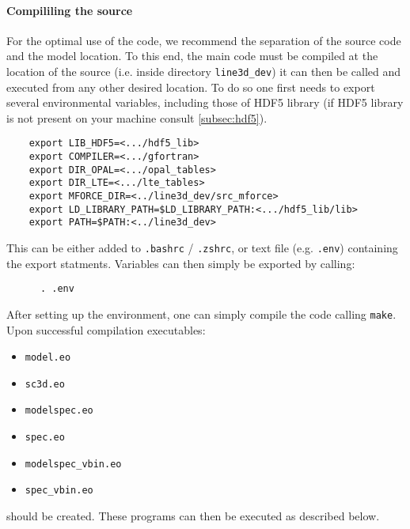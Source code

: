 \documentclass[10pt,a4paper]{article}
\begin{document}
\paragraph{Compililing the source}
\label{compilation}
For the optimal use of the code, we recommend the separation of the source code and the model location. 
To this end, the main code must be compiled at the location of the source (i.e. inside directory \verb|line3d_dev|) 
it can then be called and executed from any other desired location. 
To do so one first needs to export several environmental variables, 
including those of HDF5 library (if HDF5 library is not present on your machine consult \ref{subsec:hdf5}). \\

  \begin{verbatim}
    export LIB_HDF5=<.../hdf5_lib>
    export COMPILER=<.../gfortran>
    export DIR_OPAL=<.../opal_tables>
    export DIR_LTE=<.../lte_tables>
    export MFORCE_DIR=<../line3d_dev/src_mforce>
    export LD_LIBRARY_PATH=$LD_LIBRARY_PATH:<.../hdf5_lib/lib>
    export PATH=$PATH:<../line3d_dev>
  \end{verbatim}
  This can be either added to \texttt{.bashrc} / \texttt{.zshrc}, or text file (e.g. \texttt{.env}) containing the export statments.
  Variables can then simply be exported by calling:
  \begin{verbatim}
      . .env
  \end{verbatim}
% 

After setting up the environment, one can simply compile the code calling \texttt{make}.
Upon successful compilation executables:
\begin{itemize}
  \item \texttt{model.eo}
  \item \texttt{sc3d.eo}
  \item \texttt{modelspec.eo}
  \item \texttt{spec.eo}
  \item \texttt{modelspec\_vbin.eo}
  \item \texttt{spec\_vbin.eo} 
\end{itemize}
  should be created.
These programs can then be executed as described below.
\end{document}
